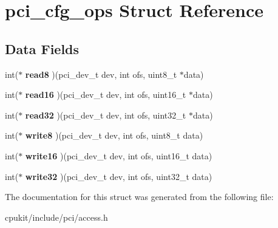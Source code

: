 \hypertarget{structpci__cfg__ops}{}\section{pci\+\_\+cfg\+\_\+ops Struct Reference}
\label{structpci__cfg__ops}
\subsection*{Data Fields}
\begin{DoxyCompactItemize}
\item 
\mbox{\label{structpci__cfg__ops_a2abbb53c38e1bc06a3550fa2f607b9b6}} 
int($\ast$ {\bfseries read8} )(pci\+\_\+dev\+\_\+t dev, int ofs, uint8\+\_\+t $\ast$data)
\item 
\mbox{\label{structpci__cfg__ops_a43c9f21a0a18ea8372ee9e01e25fdb1e}} 
int($\ast$ {\bfseries read16} )(pci\+\_\+dev\+\_\+t dev, int ofs, uint16\+\_\+t $\ast$data)
\item 
\mbox{\label{structpci__cfg__ops_ace424eaa6b172b1f0a65ed366484242d}} 
int($\ast$ {\bfseries read32} )(pci\+\_\+dev\+\_\+t dev, int ofs, uint32\+\_\+t $\ast$data)
\item 
\mbox{\label{structpci__cfg__ops_a7f94ad45c9373f4bf4e3f4f81a2c8b27}} 
int($\ast$ {\bfseries write8} )(pci\+\_\+dev\+\_\+t dev, int ofs, uint8\+\_\+t data)
\item 
\mbox{\label{structpci__cfg__ops_a02c3b01c5a82aef8bac5e69b2f29270b}} 
int($\ast$ {\bfseries write16} )(pci\+\_\+dev\+\_\+t dev, int ofs, uint16\+\_\+t data)
\item 
\mbox{\label{structpci__cfg__ops_ab37d3e8a82cdcdab7b8b7b21207b6db3}} 
int($\ast$ {\bfseries write32} )(pci\+\_\+dev\+\_\+t dev, int ofs, uint32\+\_\+t data)
\end{DoxyCompactItemize}


The documentation for this struct was generated from the following file\+:\begin{DoxyCompactItemize}
\item 
cpukit/include/pci/access.\+h\end{DoxyCompactItemize}
